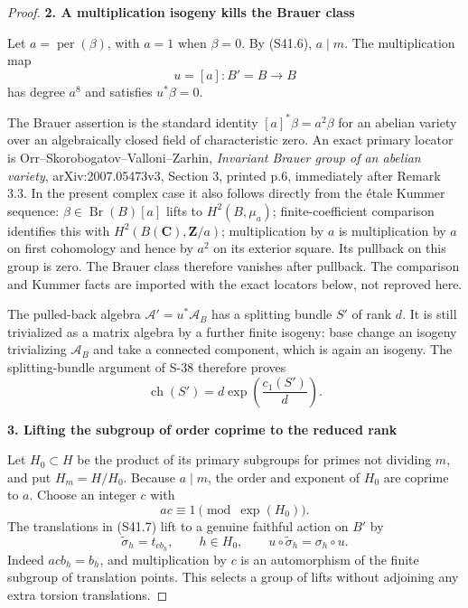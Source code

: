 \documentclass[11pt,a4paper]{article}
\theoremstyle{definition}
\begin{document}
\begin{proof}
\par

\medskip\noindent\textbf{2. A multiplication isogeny kills the Brauer class}\quad

Let \(a=\operatorname{per}(\beta)\), with \(a=1\) when \(\beta=0\). By (S41.6), \(a\mid m\). The multiplication map \[
 u=[a]:B'=B\longrightarrow B
 \tag{S41.9}
\] has degree \(a^8\) and satisfies \(u^*\beta=0\).

The Brauer assertion is the standard identity \([a]^*\beta=a^2\beta\) for an abelian variety over an algebraically closed field of characteristic zero. An exact primary locator is Orr--Skorobogatov--Valloni--Zarhin, \emph{Invariant Brauer group of an abelian variety}, arXiv:2007.05473v3, Section 3, printed p.6, immediately after Remark 3.3. In the present complex case it also follows directly from the étale Kummer sequence: \(\beta\in\operatorname{Br}(B)[a]\) lifts to \(H^2(B,\mu_a)\); finite-coefficient comparison identifies this with \(H^2(B(\mathbf C),\mathbf Z/a)\); multiplication by \(a\) is multiplication by \(a\) on first cohomology and hence by \(a^2\) on its exterior square. Its pullback on this group is zero. The Brauer class therefore vanishes after pullback. The comparison and Kummer facts are imported with the exact locators below, not reproved here.

The pulled-back algebra \(\mathscr A'=u^*\mathscr A_B\) has a splitting bundle \(S'\) of rank \(d\). It is still trivialized as a matrix algebra by a further finite isogeny: base change an isogeny trivializing \(\mathscr A_B\) and take a connected component, which is again an isogeny. The splitting-bundle argument of S-38 therefore proves \[
 \operatorname{ch}(S')=d\exp\!\left(\frac{c_1(S')}d\right).
 \tag{S41.10}
\]

\par

\medskip\noindent\textbf{3. Lifting the subgroup of order coprime to the reduced rank}\quad

Let \(H_0\subset H\) be the product of its primary subgroups for primes not dividing \(m\), and put \(H_m=H/H_0\). Because \(a\mid m\), the order and exponent of \(H_0\) are coprime to \(a\). Choose an integer \(c\) with \[
 ac\equiv1\pmod{\operatorname{exp}(H_0)}.
\] The translations in (S41.7) lift to a genuine faithful action on \(B'\) by \[
 \widetilde\sigma_h=t_{c b_h},\qquad h\in H_0,
 \qquad u\circ\widetilde\sigma_h=\sigma_h\circ u.
 \tag{S41.11}
\] Indeed \(a c b_h=b_h\), and multiplication by \(c\) is an automorphism of the finite subgroup of translation points. This selects a group of lifts without adjoining any extra torsion translations.


\end{proof}
\end{document}
